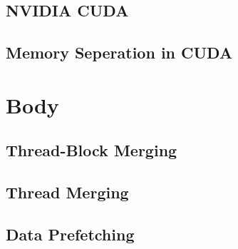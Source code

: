 \documentclass[conference]{IEEEtran}
\begin{document}
			
	\subsection{NVIDIA CUDA}
		
	
	\subsection{Memory Seperation in CUDA}
		
		
		
		

\section{Body}

	

	
	\subsection{Thread-Block Merging}
		
	
	\subsection{Thread Merging}
		
		
	\subsection{Data Prefetching}
		
\end{document}
